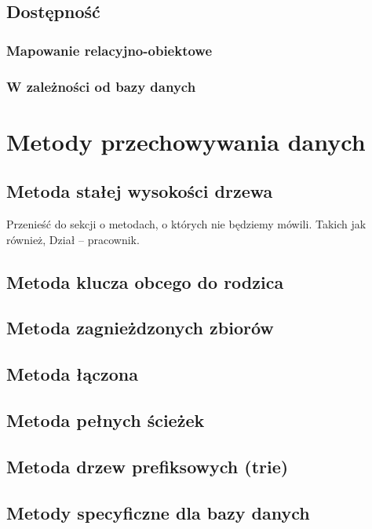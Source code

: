 \documentclass[12pt,a4paper,intlimits,oneside]{report}
\begin{document}
\section{Dostępność}
\subsection{Mapowanie relacyjno-obiektowe}
\subsection{W zależności od bazy danych}

\chapter{Metody przechowywania danych}

\section{Metoda stałej wysokości drzewa}

Przenieść do sekcji o metodach, o których nie będziemy mówili. Takich jak również, Dział -- pracownik.

\section{Metoda klucza obcego do rodzica}

\section{Metoda zagnieżdzonych zbiorów}

\section{Metoda łączona}

\section{Metoda pełnych ścieżek}

\section{Metoda drzew prefiksowych (trie)}

\section{Metody specyficzne dla bazy danych}
\end{document}
